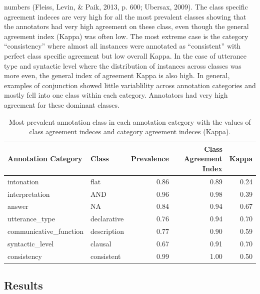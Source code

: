 \documentclass[oneside]{report}
\theoremstyle{definition}
\theoremstyle{definition}
\theoremstyle{definition}
\theoremstyle{remark}
\begin{document}
numbers (Fleiss, Levin, \& Paik, 2013, p. 600; Ubersax, 2009). The class
specific agreement indeces are very high for all the most prevalent
classes showing that the annotators had very high agreement on these
class, even though the general agreement index (Kappa) was often low.
The most extreme case is the category ``consistency'' where almost all
instances were annotated as ``consistent'' with perfect class specific
agreement but low overall Kappa. In the case of utterance type and
syntactic level where the distribution of instances across classes was
more even, the general index of agreement Kappa is also high. In
general, examples of conjunction showed little variablility across
annotation categories and mostly fell into one class within each
category. Annotators had very high agreement for these dominant classes.
\begin{table}

\caption{\label{tab:andAgreeStats}Most prevalent annotation class in each annotation category with the values of class agreement indeces and category agreement indeces (Kappa).}
\centering
\begin{tabular}[t]{l|l|r|r|r}
\hline
Annotation Category & Class & Prevalence & Class Agreement Index & Kappa\\
\hline
intonation & flat & 0.86 & 0.89 & 0.24\\
\hline
interpretation & AND & 0.96 & 0.98 & 0.39\\
\hline
answer & NA & 0.84 & 0.94 & 0.67\\
\hline
utterance\_type & declarative & 0.76 & 0.94 & 0.70\\
\hline
communicative\_function & description & 0.77 & 0.90 & 0.59\\
\hline
syntactic\_level & clausal & 0.67 & 0.91 & 0.70\\
\hline
consistency & consistent & 0.99 & 1.00 & 0.50\\
\hline
\end{tabular}
\end{table}
\subsection{Results}\label{results}
\end{document}
